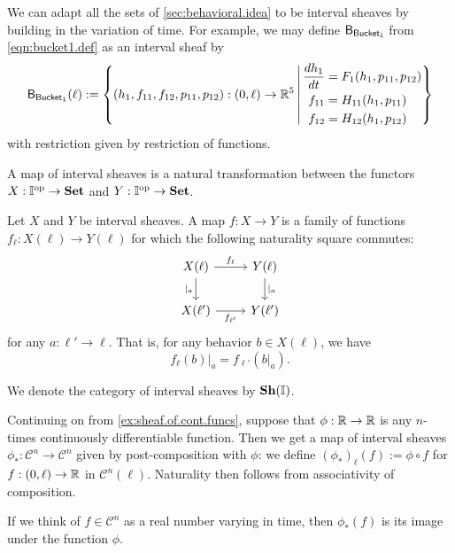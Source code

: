 \documentclass[DynamicalBook]{subfiles}
\begin{document}
  \begin{example}
    We can adapt all the sets of \cref{sec:behavioral.idea} to be interval sheaves by building in the variation of time. For example, we may define $\mathsf{B}_{\mathsf{Bucket_{1}}}$ from \cref{eqn:bucket1.def} as an interval sheaf by
    \[
\mathsf{B}_{{\mathsf{Bucket}_{1}}}(\ell) :=\left\{ (h_1, f_{11}, f_{12}, p_{11}, p_{12}) :(0, \ell)
  \to \mathbb{R}^5\, \middle|\,
\begin{aligned}
  \frac{dh_1}{dt} &= F_1(h_1, p_{11}, p_{12}) \\
  f_{11} &= H_{11}(h_1, p_{11})\\
  f_{12} &= H_{12}(h_1, p_{12})
\end{aligned}
\right\}
    \]
  with restriction given by restriction of functions.
    \end{example}


  A map of interval sheaves is a natural transformation between the functors $X : \mathbb{I}^{\textnormal{op}} \to \textbf{Set}$ and $Y : \mathbb{I}^{\textnormal{op}} \to \textbf{Set}$.
  \begin{definition}
    Let $X$ and $Y$ be interval sheaves. A map $f : X \to Y$ is a family of functions $f_{{\ell}} : X(\ell) \to Y(\ell)$ for which the following naturality square commutes:
    \[
\begin{tikzcd}
	{X(\ell)} & {Y(\ell)} \\
	{X(\ell')} & {Y(\ell')}
	\arrow["{|_a}"', from=1-1, to=2-1]
	\arrow["{f_{\ell}}", from=1-1, to=1-2]
	\arrow["{|_a}", from=1-2, to=2-2]
	\arrow["{f_{\ell'}}"', from=2-1, to=2-2]
\end{tikzcd}
    \]
   for any $a : \ell' \to \ell$. That is, for any behavior $b \in X(\ell)$, we have
    $$f_{\ell}(b)|_{a} = f_{\ell'}(b|_{a}).$$

We denote the category of interval sheaves by $\textbf{Sh}(\mathbb{I})$.
  \end{definition}

  \begin{example}\label{ex:sheaf.of.cont.funcs.map}
    Continuing on from \cref{ex:sheaf.of.cont.funcs}, suppose that $\phi : \mathbb{R} \to \mathbb{R}$ is any $n$-times continuously differentiable function. Then we get a map of interval sheaves $\phi_{{\ast}} : \mathcal{C}^{n} \to \mathcal{C}^{n}$ given by post-composition with $\phi$: we define $(\phi_{{\ast}})_{\ell}(f) := \phi \circ f$ for $f : (0, \ell) \to \mathbb{R}$ in $\mathcal{C}^{n}(\ell)$. Naturality then follows from associativity of composition.

    If we think of $f \in \mathcal{C}^{n}$ as a real number varying in time, then $\phi_{\ast}(f)$ is its image under the function $\phi$.
  \end{example}
\end{document}
